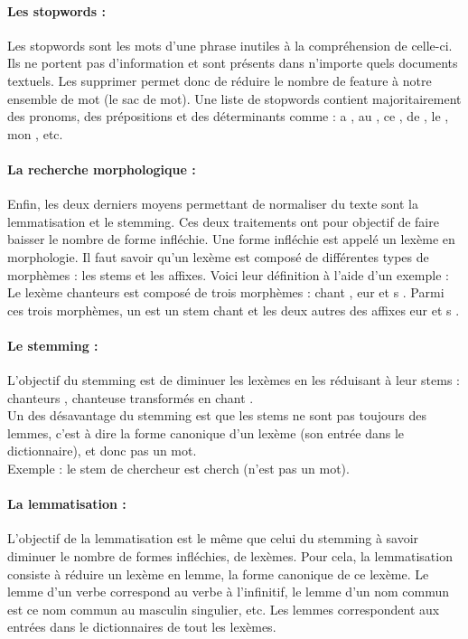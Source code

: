                 \paragraph{Les stopwords :}
                    Les stopwords sont les mots d'une phrase inutiles à la compréhension de celle-ci. Ils ne portent pas d'information et sont présents dans n'importe quels documents textuels. Les supprimer permet donc de réduire le nombre de feature à notre ensemble de mot (le sac de mot). Une liste de stopwords contient majoritairement des pronoms, des prépositions et des déterminants comme : \og a \fg, \og au \fg, \og ce \fg, \og de \fg, \og le \fg, \og mon \fg, etc.

                \paragraph{La recherche morphologique :}
                    Enfin, les deux derniers moyens permettant de normaliser du texte sont la lemmatisation et le stemming. Ces deux traitements ont pour objectif de faire baisser le nombre de forme infléchie. Une forme infléchie est appelé un lexème en morphologie. Il faut savoir qu'un lexème est composé de différentes types de morphèmes : les stems et les affixes. Voici leur définition à l'aide d'un exemple :\\
                    Le lexème \og chanteurs \fg est composé de trois morphèmes : \og chant \fg, \og eur \fg et \og s \fg. Parmi ces trois morphèmes, un est un stem \og chant \fg et les deux autres des affixes \og eur \fg et \og s \fg.


                \paragraph{Le stemming :}
                    L'objectif du stemming est de diminuer les lexèmes en les réduisant à leur stems : \og chanteurs \fg, \og chanteuse \fg transformés en \og chant \fg.\\
                    Un des désavantage du stemming est que les stems ne sont pas toujours des lemmes, c'est à dire la forme canonique d'un lexème (son entrée dans le dictionnaire), et donc pas un mot.\\
                    Exemple : le stem de \og chercheur \fg est \og cherch \fg (n'est pas un mot).

                \paragraph{La lemmatisation :}
                    L'objectif de la lemmatisation est le même que celui du stemming à savoir diminuer le nombre de formes infléchies, de lexèmes. Pour cela, la lemmatisation consiste à réduire un lexème en lemme, la forme canonique de ce lexème. Le lemme d'un verbe correspond au verbe à l'infinitif, le lemme d'un nom commun est ce nom commun au masculin singulier, etc. Les lemmes correspondent aux entrées dans le dictionnaires de tout les lexèmes.\\

